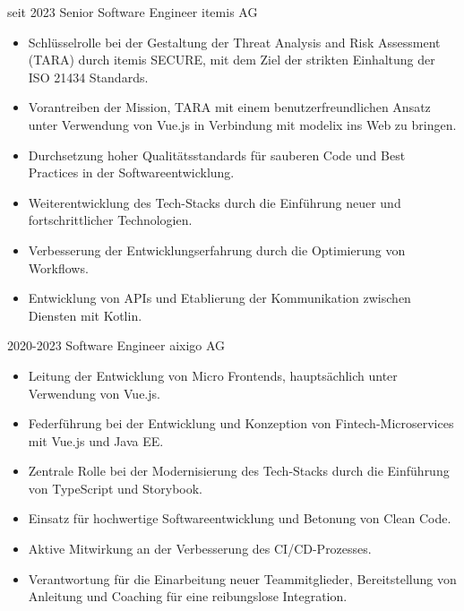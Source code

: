 \documentclass[letterpaper]{twentyonesecondcv} %
\begin{document}
{    \begin{twenty}
      \twentyitem
        {seit 2023}
        {Senior Software Engineer}
        {\newline itemis AG}
        {
        \vspace{-3mm}
        \begin{itemize}[leftmargin=5mm,noitemsep,topsep=0pt]
          \item Schlüsselrolle bei der Gestaltung der Threat Analysis and Risk Assessment (TARA) durch itemis SECURE, mit dem Ziel der strikten Einhaltung der ISO 21434 Standards.
          \item Vorantreiben der Mission, TARA mit einem benutzerfreundlichen Ansatz unter Verwendung von Vue.js in Verbindung mit modelix ins Web zu bringen.
          \item Durchsetzung hoher Qualitätsstandards für sauberen Code und Best Practices in der Softwareentwicklung.
          \item Weiterentwicklung des Tech-Stacks durch die Einführung neuer und fortschrittlicher Technologien.
          \item Verbesserung der Entwicklungserfahrung durch die Optimierung von Workflows.
          \item Entwicklung von APIs und Etablierung der Kommunikation zwischen Diensten mit Kotlin.
        \end{itemize}
        }
      \twentyitem
        {2020-2023}
        {Software Engineer}
        {\newline aixigo AG}
        {
        \vspace{-3mm}
        \begin{itemize}[leftmargin=5mm,noitemsep,topsep=0pt]
          \item Leitung der Entwicklung von Micro Frontends, hauptsächlich unter Verwendung von Vue.js.
          \item Federführung bei der Entwicklung und Konzeption von Fintech-Microservices mit Vue.js und Java EE.
          \item Zentrale Rolle bei der Modernisierung des Tech-Stacks durch die Einführung von TypeScript und Storybook.
          \item Einsatz für hochwertige Softwareentwicklung und Betonung von Clean Code.
          \item Aktive Mitwirkung an der Verbesserung des CI/CD-Prozesses.
          \item Verantwortung für die Einarbeitung neuer Teammitglieder, Bereitstellung von Anleitung und Coaching für eine reibungslose Integration.

\end{itemize}}
\end{twenty}}
\end{document}
